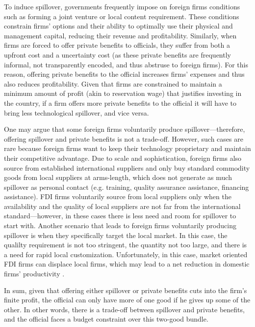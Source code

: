To induce spillover, governments frequently impose on foreign firms conditions such as forming a joint venture or local content requirement. These conditions constrain firms' options and their ability to optimally use their physical and management capital, reducing their revenue and profitability. Similarly, when firms are forced to offer private benefits to officials, they suffer from both a upfront cost and a uncertainty cost (as these private benefits are frequently informal, not transparently encoded, and thus abstruse to foreign firms). For this reason, offering private benefits to the official increases firms' expenses and thus also reduces profitability. Given that firms are constrained to maintain a minimum amount of profit (akin to reservation wage) that justifies investing in the country, if a firm offers more private benefits to the official it will have to bring less technological spillover, and vice versa.

One may argue that some foreign firms voluntarily produce spillover---therefore, offering spillover and private benefits is not a trade-off. However, such cases are rare because foreign firms want to keep their technology proprietary and maintain their competitive advantage. Due to scale and sophistication, foreign firms also source from established international suppliers and only buy standard commodity goods from local suppliers at arms-length, which does not generate as much spillover as personal contact (e.g. training, quality assurance assistance, financing assistance). FDI firms voluntarily source from local suppliers only when the availability and the quality of local suppliers are not far from the international standard---however, in these cases there is less need and room for spillover to start with. Another scenario that leads to foreign firms voluntarily producing spillover is when they specifically target the local market. In this case, the qualilty requirement is not too stringent, the quantity not too large, and there is a need for rapid local customization. Unfortunately, in this case, market oriented FDI firms can displace local firms, which may lead to a net reduction in domestic firms' productivity \citep{Mody2004}.

In sum, given that offering either spillover or private benefits cuts into the firm's finite profit, the official can only have more of one good if he gives up some of the other. In other words, there is a trade-off between spillover and private benefits, and the official faces a budget constraint over this two-good bundle.

